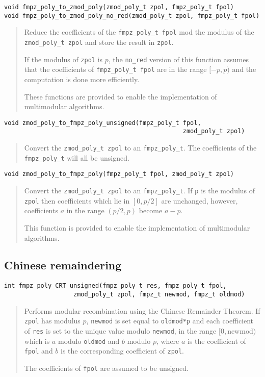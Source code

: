 \documentclass[a4paper,10pt]{article}
\newcommand{\code}{\lstinline}
\begin{document}
\begin{lstlisting}
void fmpz_poly_to_zmod_poly(zmod_poly_t zpol, fmpz_poly_t fpol)
void fmpz_poly_to_zmod_poly_no_red(zmod_poly_t zpol, fmpz_poly_t fpol)
\end{lstlisting}
\begin{quote}
Reduce the coefficients of the \code{fmpz_poly_t fpol} mod the modulus of the \code{zmod_poly_t zpol} and store the result in \code{zpol}.

If the modulus of \code{zpol} is $p$, the \code{no_red} version of this function assumes that the coefficients of \code{fmpz_poly_t fpol} are in the range $[-p, p)$ and the computation is done more efficiently.

These functions are provided to enable the implementation of multimodular algorithms.
\end{quote}

\begin{lstlisting}
void zmod_poly_to_fmpz_poly_unsigned(fmpz_poly_t fpol, 
                                                 zmod_poly_t zpol)
\end{lstlisting}
\begin{quote}
Convert the \code{zmod_poly_t zpol} to an \code{fmpz_poly_t}. The coefficients of the \code{fmpz_poly_t} will all be unsigned.
\end{quote}

\begin{lstlisting}
void zmod_poly_to_fmpz_poly(fmpz_poly_t fpol, zmod_poly_t zpol)
\end{lstlisting}
\begin{quote}
Convert the \code{zmod_poly_t zpol} to an \code{fmpz_poly_t}. If \code{p} is the modulus of \code{zpol} then coefficients which lie in $[0, p/2]$ are unchanged, however, coefficients $a$ in the range $(p/2, p)$ become $a - p$.

This function is provided to enable the implementation of multimodular algorithms.
\end{quote}

\subsection{Chinese remaindering}

\begin{lstlisting}
int fmpz_poly_CRT_unsigned(fmpz_poly_t res, fmpz_poly_t fpol, 
                   zmod_poly_t zpol, fmpz_t newmod, fmpz_t oldmod)
\end{lstlisting}
\begin{quote}
Performs modular recombination using the Chinese Remainder Theorem. If \code{zpol} has modulus $p$, \code{newmod} is set equal to \code{oldmod*p} and each coefficient of \code{res} is set to the unique value modulo \code{newmod}, in the range $[0, \mbox{newmod})$ which is $a$ modulo \code{oldmod} and $b$ modulo $p$, where $a$ is the coefficient of \code{fpol} and $b$ is the corresponding coefficient of \code{zpol}.

The coefficients of \code{fpol} are assumed to be unsigned. 
\end{quote}
\end{document}
